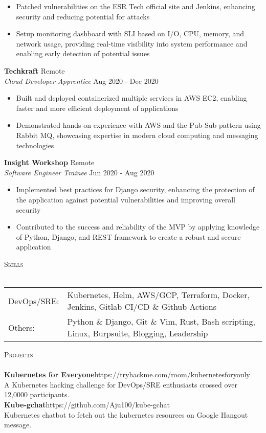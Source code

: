 \documentclass[a4paper]{article}
\newcommand{\lineunder} {
    \vspace*{-8pt} \\
    \hspace*{-18pt} \hrulefill \\
}
\newcommand{\header} [1] {
    {\hspace*{-18pt}\vspace*{6pt} \textsc{#1}}
    \vspace*{-6pt} \lineunder
}
\begin{document}
\begin{itemize} \itemsep 1pt
	\item Patched vulnerabilities on the ESR Tech official site and Jenkins, enhancing security and reducing potential for attacks
	\item Setup monitoring dashboard with SLI based on I/O, CPU, memory, and network usage, providing real-time visibility into system performance and enabling early detection of potential issues
\end{itemize}
\textbf{Techkraft} \hfill Remote\\
\textit{Cloud Developer Apprentice} \hfill Aug 2020 - Dec 2020\\
\vspace{-1mm}
\begin{itemize} \itemsep 1pt
	\item Built and deployed containerized multiple services in AWS EC2, enabling faster and more efficient deployment of applications
	\item Demonstrated hands-on experience with AWS and the Pub-Sub pattern using Rabbit MQ, showcasing expertise in modern cloud computing and messaging technologies
\end{itemize}
\textbf{Insight Workshop} \hfill Remote\\
\textit{Software Engineer Trainee} \hfill Jun 2020 - Aug 2020\\
\vspace{-1mm}
\begin{itemize} \itemsep 1pt
	\item Implemented best practices for Django security, enhancing the protection of the application against potential vulnerabilities and improving overall security
	\item Contributed to the success and reliability of the MVP by applying knowledge of Python, Django, and REST framework to create a robust and secure application
\end{itemize}

\header{Skills}
\begin{tabular}{ l l }
	DevOps/SRE: & Kubernetes, Helm, AWS/GCP, Terraform, Docker, Jenkins, Gitlab CI/CD \& Github Actions      \\
	Others:     & Python \& Django, Git \& Vim, Rust, Bash scripting, Linux, Burpsuite, Blogging, Leadership \\
\end{tabular}
\vspace{2mm}

\header{Projects}
{\textbf{Kubernetes for Everyone}}\hfill https://tryhackme.com/room/kubernetesforyouly\\
A Kubernetes hacking challenge for DevOps/SRE enthusiasts crossed over 12,0000 participants.\\
\vspace*{2mm}
{\textbf{Kube-gchat}}\hfill https://github.com/Aju100/kube-gchat\\
Kubernetes chatbot to fetch out the kubernetes resources on Google Hangout message.\\
\vspace*{2mm}
\end{document}
